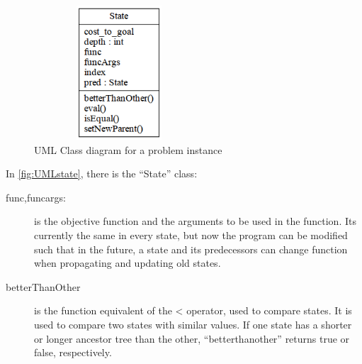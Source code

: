\documentclass[journal]{IEEEtran}
\begin{document}
\begin{figure}[Hb]
\centering
\includegraphics[height=5cm,keepaspectratio,width=2.5in]{fig/problem.png}%
\caption{UML Class diagram for a problem instance}
\label{fig:UMLproblem}
\end{figure}

In \autoref{fig:UMLstate}, there is the ``State'' class:
\begin{description}
    \item[func,funcargs:] is the objective function and the arguments
        to be used in the function. Its currently the same in every state,
        but now the program can be modified such that in the future, a state
        and its predecessors can change function when propagating and updating
        old states.
    \item[betterThanOther] is the function equivalent of the \textless{} operator,
        used to compare states. It is used to compare two states with
        similar values. If one state has a shorter or longer ancestor tree than the
        other, ``betterthanother'' returns true or false, respectively.
\end{description}
\end{document}
